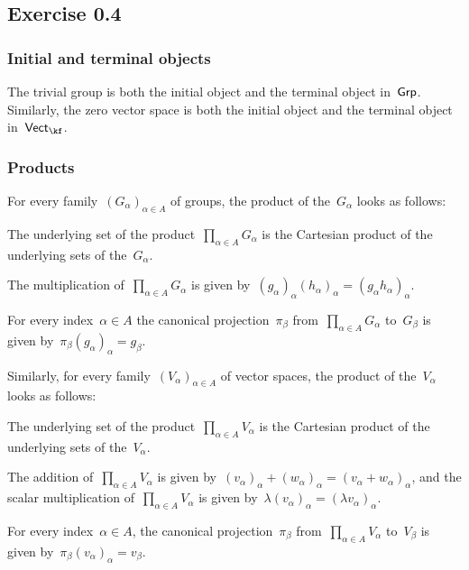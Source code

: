 \subsection{Exercise 0.4}



\subsubsection{Initial and terminal objects}

The trivial group is both the initial object and the terminal object in~$\mathsf{Grp}$.
Similarly, the zero vector space is both the initial object and the terminal object in~$\Vectk$.



\subsubsection{Products}

For every family~$(G_α)_{α ∈ A}$ of groups, the product of the~$G_α$ looks as follows:
\begin{itemize*}

	\item
		The underlying set of the product~$\prod_{α ∈ A} G_α$ is the Cartesian product of the underlying sets of the~$G_α$.

	\item
		The multiplication of~$∏_{α ∈ A} G_α$ is given by~$(g_α)_α (h_α)_α = (g_α h_α)_α$.

	\item
		For every index~$α ∈ A$ the canonical projection~$π_β$ from~$∏_{α ∈ A} G_α$ to~$G_β$ is given by~$π_β (g_α)_α  = g_β$.

\end{itemize*}
Similarly, for every family~$(V_α)_{α ∈ A}$ of vector spaces, the product of the~$V_α$ looks as follows:
\begin{itemize*}

	\item
		The underlying set of the product~$\prod_{α ∈ A} V_α$ is the Cartesian product of the underlying sets of the~$V_α$.

	\item
		The addition of~$∏_{α ∈ A} V_α$ is given by~$(v_α)_α + (w_α)_α =(v_α + w_α)_α$, and the scalar multiplication of~$∏_{α ∈ A} V_α$ is given by~$λ (v_α)_α = (λ v_α)_α$.

	\item
		For every index~$α ∈ A$, the canonical projection~$π_β$ from~$∏_{α ∈ A} V_α$ to~$V_β$ is given by~$π_β (v_α)_α  = v_β$.

\end{itemize*}




